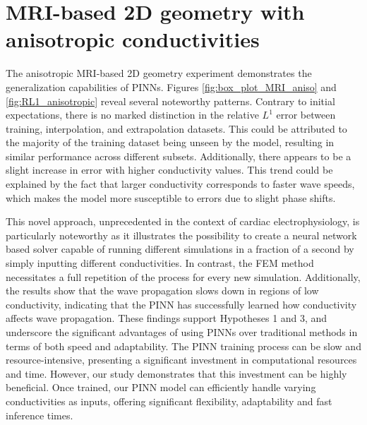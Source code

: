 

\section{MRI-based 2D geometry with anisotropic conductivities}
The anisotropic MRI-based 2D geometry experiment demonstrates the generalization capabilities of PINNs.
Figures \ref{fig:box_plot_MRI_aniso} and \ref{fig:RL1_anisotropic} reveal several noteworthy patterns. Contrary to initial expectations, there is no marked distinction in the relative $L^1$ error between training, interpolation, and extrapolation datasets. This could be attributed to the majority of the training dataset being unseen by the model, resulting in similar performance across different subsets. Additionally, there appears to be a slight increase in error with higher conductivity values. This trend could be explained by the fact that larger conductivity corresponds to faster wave speeds, which makes the model more susceptible to errors due to slight phase shifts. 
 
This novel approach, unprecedented in the context of cardiac electrophysiology, is particularly noteworthy as it illustrates the possibility to create a neural network based solver capable of running different simulations in a fraction of a second by simply inputting different conductivities. In contrast, the FEM method necessitates a full repetition of the process for every new simulation. Additionally, the results show that the wave propagation slows down in regions of low conductivity, indicating that the PINN has successfully learned how conductivity affects wave propagation. These findings support Hypotheses 1 and 3, and underscore the significant advantages of using PINNs over traditional methods in terms of both speed and adaptability. 
The PINN training process can be slow and resource-intensive, presenting a significant investment in computational resources and time. However, our study demonstrates that this investment can be highly beneficial. Once trained, our PINN model can efficiently handle varying conductivities as inputs, offering significant flexibility, adaptability and fast inference times.

